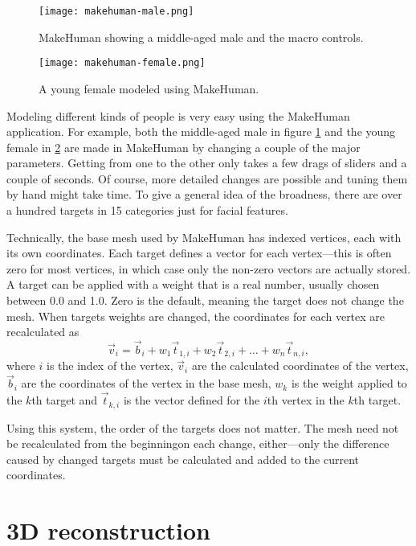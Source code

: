 \begin{figure}
    \centering
    \texttt{[image: makehuman-male.png]}
    \caption{MakeHuman showing a middle-aged male and the macro controls.}
    \label{fig:makehuman-male}
\end{figure}

\begin{figure}
    \centering
    \texttt{[image: makehuman-female.png]}
    \caption{A young female modeled using MakeHuman.}
    \label{fig:makehuman-female}
\end{figure}

Modeling different kinds of people is very easy using the MakeHuman application. For example, both the middle-aged male in figure \ref{fig:makehuman-male} and the young female in \ref{fig:makehuman-female} are made in MakeHuman by changing a couple of the major parameters. Getting from one to the other only takes a few drags of sliders and a couple of seconds. Of course, more detailed changes are possible and tuning them by hand might take time. To give a general idea of the broadness, there are over a hundred targets in 15 categories just for facial features.

Technically, the base mesh used by MakeHuman has indexed vertices, each with its own coordinates. Each target defines a vector for each vertex---this is often zero for most vertices, in which case only the non-zero vectors are actually stored. A target can be applied with a weight that is a real number, usually chosen between 0.0 and 1.0. Zero is the default, meaning the target does not change the mesh. When targets weights are changed, the coordinates for each vertex are recalculated as
%
\begin{equation*}
    \vec{v}_i = \vec{b}_i + w_1 \vec{t}_{1,i} + w_2 \vec{t}_{2,i} + \dots  + w_n \vec{t}_{n,i},
\end{equation*}
%
where $i$ is the index of the vertex, $\vec{v}_i$ are the calculated coordinates of the vertex, $\vec{b}_i$ are the coordinates of the vertex in the base mesh, $w_k$ is the weight applied to the $k$th target and $\vec{t}_{k,i}$ is the vector defined for the $i$th vertex in the $k$th target.

Using this system, the order of the targets does not matter. The mesh need not be recalculated from the beginningon each change, either---only the difference caused by changed targets must be calculated and added to the current coordinates.

\section{3D reconstruction}

